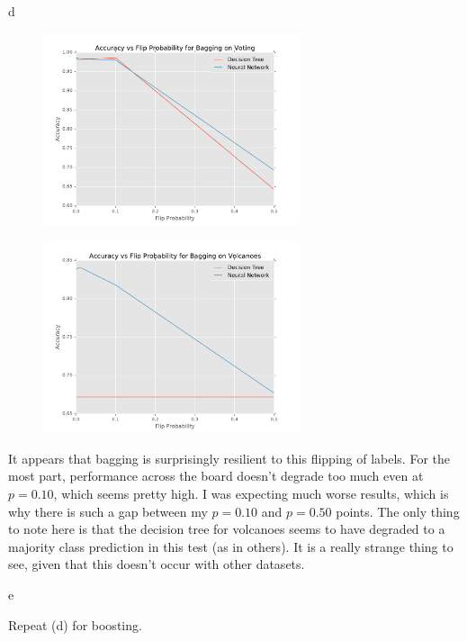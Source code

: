 \documentclass[fleqn]{homework}
\begin{document}
\begin{problem}{d}
    \begin{figure}[h!]
      \centering
      \caption{}
      \label{f:d-voting}
      \includegraphics[width=0.67\textwidth]{d-voting.pdf}
    \end{figure}
    \begin{figure}[h!]
      \centering
      \caption{}
      \label{f:d-volcanoes}
      \includegraphics[width=0.67\textwidth]{d-volcanoes.pdf}
    \end{figure}

    It appears that bagging is surprisingly resilient to this flipping of
    labels.  For the most part, performance across the board doesn't degrade too
    much even at $p=0.10$, which seems pretty high.  I was expecting much worse
    results, which is why there is such a gap between my $p=0.10$ and $p=0.50$
    points.  The only thing to note here is that the decision tree for volcanoes
    seems to have degraded to a majority class prediction in this test (as in
    others).  It is a really strange thing to see, given that this doesn't occur
    with other datasets.
  \end{problem}

  \begin{problem}{e}
    \begin{question}
      Repeat (d) for boosting.
    \end{question}
  \end{problem}
\end{document}

